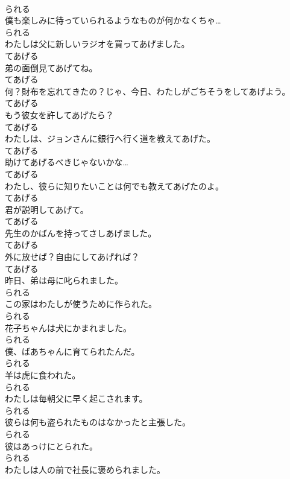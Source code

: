 \documentclass[8pt]{extreport}
\begin{document}
\begin{CJK}{UTF8}{min}
\\	られる
\\	僕も楽しみに待っていられるようなものが何かなくちゃ…	
\\	られる
\\	わたしは父に新しいラジオを買ってあげました。	
\\	てあげる
\\	弟の面倒見てあげてね。	
\\	てあげる
\\	何？財布を忘れてきたの？じゃ、今日、わたしがごちそうをしてあげよう。	
\\	てあげる
\\	もう彼女を許してあげたら？	
\\	てあげる
\\	わたしは、ジョンさんに銀行へ行く道を教えてあげた。	
\\	てあげる
\\	助けてあげるべきじゃないかな…	
\\	てあげる
\\	わたし、彼らに知りたいことは何でも教えてあげたのよ。	
\\	てあげる
\\	君が説明してあげて。	
\\	てあげる
\\	先生のかばんを持ってさしあげました。	
\\	てあげる
\\	外に放せば？自由にしてあげれば？	
\\	てあげる
\\	昨日、弟は母に叱られました。	
\\	られる
\\	この家はわたしが使うために作られた。	
\\	られる
\\	花子ちゃんは犬にかまれました。	
\\	られる
\\	僕、ばあちゃんに育てられたんだ。	
\\	られる
\\	羊は虎に食われた。	
\\	られる
\\	わたしは毎朝父に早く起こされます。	
\\	られる
\\	彼らは何も盗られたものはなかったと主張した。	
\\	られる
\\	彼はあっけにとられた。	
\\	られる
\\	わたしは人の前で社長に褒められました。	

\end{CJK}
\end{document}
